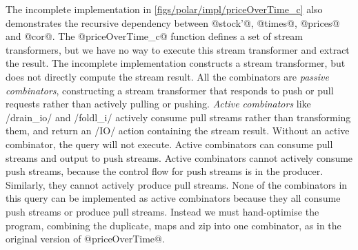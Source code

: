 The incomplete implementation in \cref{figs/polar/impl/priceOverTime_c} also demonstrates the recursive dependency between @stock'@, @times@, @prices@ and @cor@.
The @priceOverTime_c@ function defines a set of stream transformers, but we have no way to execute this stream transformer and extract the result.
The incomplete implementation constructs a stream transformer, but does not directly compute the stream result.
All the combinators are \emph{passive combinators}, constructing a stream transformer that responds to push or pull requests rather than actively pulling or pushing.
\emph{Active combinators} like \Hs/drain_io/ and \Hs/foldl_i/ actively consume pull streams rather than transforming them, and return an \Hs/IO/ action containing the stream result.
Without an active combinator, the query will not execute.
Active combinators can consume pull streams and output to push streams.
Active combinators cannot actively consume push streams, because the control flow for push streams is in the producer.
Similarly, they cannot actively produce pull streams.
None of the combinators in this query can be implemented as active combinators because they all consume push streams or produce pull streams.
Instead we must hand-optimise the program, combining the duplicate, maps and zip into one combinator, as in the original version of @priceOverTime@.


% 
% 
% 
% 
% 

